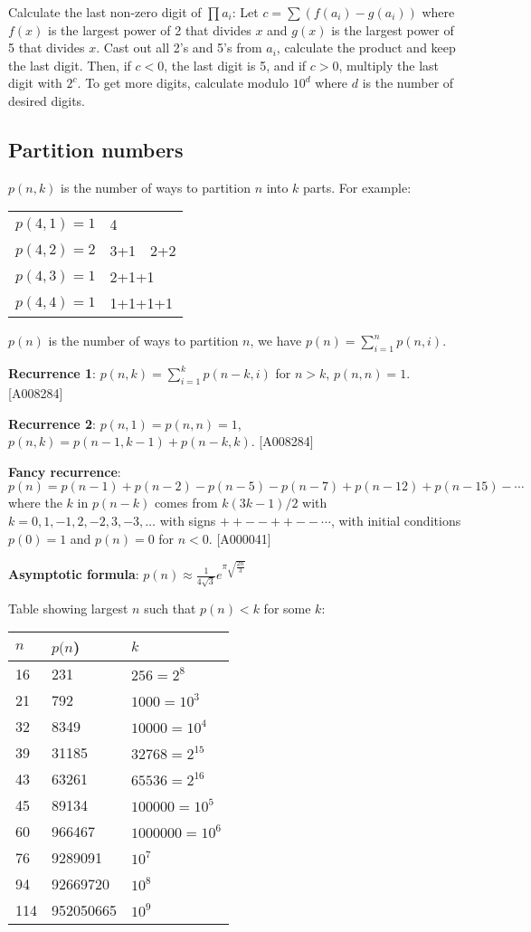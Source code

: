 \documentclass[a4paper,11pt]{article}
\begin{document}
Calculate the last non-zero digit of $\prod a_i$: Let $c=\sum (f(a_i)-g(a_i))$ where $f(x)$ is the largest power of 2 that divides $x$ and $g(x)$ is the largest power of 5 that divides $x$. Cast out all 2's and 5's from $a_i$, calculate the product and keep the last digit. Then, if $c<0$, the last digit is 5, and if $c>0$, multiply the last digit with $2^c$. To get more digits, calculate modulo $10^d$ where $d$ is the number of desired digits.

\subsection{Partition numbers}

$p(n,k)$ is the number of ways to partition $n$ into $k$ parts. For example:

\begin{tabular}{|l|l|}
\hline
	$p(4,1)=1$ & 4  \\
	$p(4,2)=2$ & 3+1 \,\, 2+2 \\
	$p(4,3)=1$ & 2+1+1  \\
	$p(4,4)=1$ & 1+1+1+1  \\
\hline
\end{tabular}

$p(n)$ is the number of ways to partition $n$, we have $p(n)=\sum_{i=1}^n p(n,i)$.

{\bf Recurrence 1}: $p(n,k)=\sum_{i=1}^k p(n-k,i)$ for $n>k$, $p(n,n)=1$. [A008284]

{\bf Recurrence 2}: $p(n,1)=p(n,n)=1$, $p(n,k)=p(n-1,k-1)+p(n-k,k)$. [A008284]

{\bf Fancy recurrence}: $p(n)=p(n-1)+p(n-2)-p(n-5)-p(n-7)+p(n-12)+p(n-15)- \cdots$ where the $k$ in $p(n-k)$ comes from $k(3k-1)/2$ with $k=0, 1, -1, 2, -2, 3, -3, \ldots$ with signs $+ + - - + + - - \cdots$, with initial conditions $p(0)=1$ and $p(n)=0$ for $n<0$. [A000041]

{\bf Asymptotic formula}: $p(n)\approx \frac{1}{4\sqrt{3}}e^{\pi \sqrt{\frac{2n}{3}}}$

Table showing largest $n$ such that $p(n)< k$ for some $k$:

\begin{tabular}{|l|l|l|}
\hline
	$n$ & $p(n$) & $k$ \\
\hline
	16 & 231 & $256=2^8$ \\
	21 & 792 & $1000=10^3$ \\
	32 & 8349 & $10000=10^4$ \\
	39 & 31185 & $32768=2^{15}$ \\
	43 & 63261 & $65536=2^{16}$ \\
	45 & 89134 & $100000=10^5$ \\
	60 & 966467 & $1000000=10^6$ \\
	76 & 9289091 & $10^7$ \\
	94 & 92669720 & $10^8$ \\
	114 & 952050665 & $10^9$ \\
\hline
\end{tabular}
\end{document}
